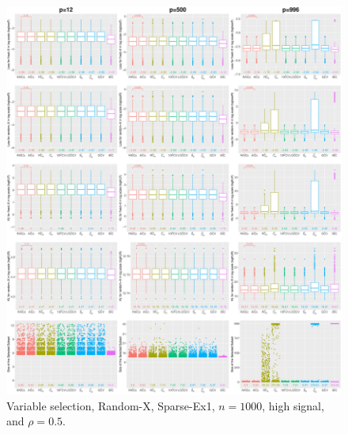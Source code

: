 \begin{figure}[!ht]
\centering
\includegraphics[width=\textwidth]{figures/supplement/randomx/subset_selection/Sparse-Ex1_n1000_hsnr_rho05.eps}
\caption{Variable selection, Random-X, Sparse-Ex1, $n=1000$, high signal, and $\rho=0.5$.}
\end{figure}
\clearpage

